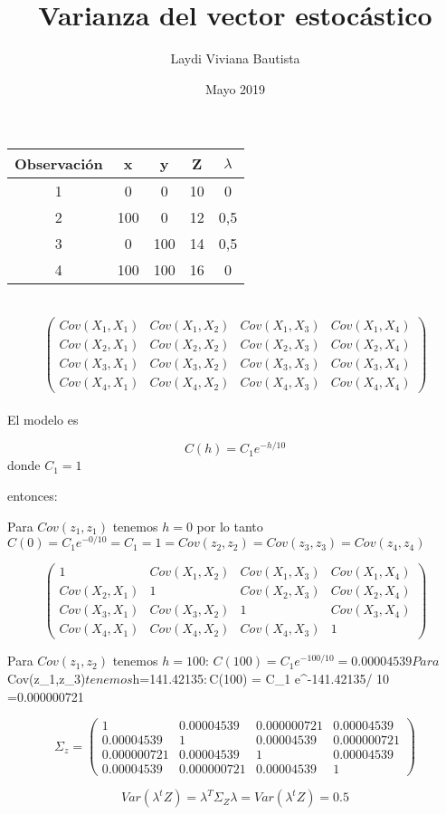 \documentclass{article}
\title{Varianza del vector estocástico}
\author{Laydi Viviana Bautista}
\date{Mayo 2019}
\begin{document}
\maketitle


\begin{tabular}{|c|c|c|c|c|}
    \hline
     Observación & x & y & Z & $\lambda$ \\ 
    \hline
    1 & 0 & 0 & 10 & 0 \\
    2 & 100 & 0 & 12 & 0,5 \\
    3 & 0 & 100 & 14 & 0,5 \\
    4 & 100 & 100& 16 & 0 \\ 
    \hline
\end{tabular} \\

$$
\begin{pmatrix}
Cov(X_1, X_1) & Cov(X_1,X_2) & Cov(X_1,X_3)  & Cov(X_1,X_4)  \\
Cov(X_2, X_1) & Cov(X_2,X_2) & Cov(X_2,X_3)   & Cov(X_2,X_4) \\
Cov(X_3, X_1) & Cov(X_3,X_2) & Cov(X_3,X_3)    & Cov(X_3,X_4)\\
Cov(X_4, X_1) & Cov(X_4,X_2) & Cov(X_4,X_3)    & Cov(X_4,X_4)
\end{pmatrix}
$$
\\

El modelo es 

$$C(h) = C_1 e^{-h / 10}$$
donde $C_1 = 1$

entonces: 

Para $Cov(z_1,z_1)$ tenemos $h=0$ por lo tanto $C(0) = C_1 e^{-0 / 10} = C_1 = 1 = Cov(z_2,z_2) = Cov(z_3,z_3) = Cov(z_4,z_4) $  



$$
\begin{pmatrix}
1 & Cov(X_1,X_2) & Cov(X_1,X_3)  & Cov(X_1,X_4)  \\
Cov(X_2, X_1) & 1 & Cov(X_2,X_3)   & Cov(X_2,X_4) \\
Cov(X_3, X_1) & Cov(X_3,X_2) & 1   & Cov(X_3,X_4)\\
Cov(X_4, X_1) & Cov(X_4,X_2) & Cov(X_4,X_3)  & 1
\end{pmatrix}
$$


Para $Cov(z_1,z_2)$ tenemos $h=100$: 
$C(100) = C_1 e^{-100 / 10} = 0.00004539

Para $Cov(z_1,z_3)$ tenemos $h=141.42135$: 
$C(100) = C_1 e^{-141.42135/ 10} =0.000000721

$$
\Sigma_z =
\begin{pmatrix}
1 & 0.00004539 & 0.000000721 & 0.00004539  \\
0.00004539 & 1 & 0.00004539   & 0.000000721  \\
0.000000721 & 0.00004539  & 1   & 0.00004539 \\
0.00004539  & 0.000000721 & 0.00004539  & 1
\end{pmatrix}
$$

$$Var(\lambda^t Z) = \lambda^T \Sigma_Z \lambda  = Var(\lambda^t Z) = 0.5$$
\end{document}
